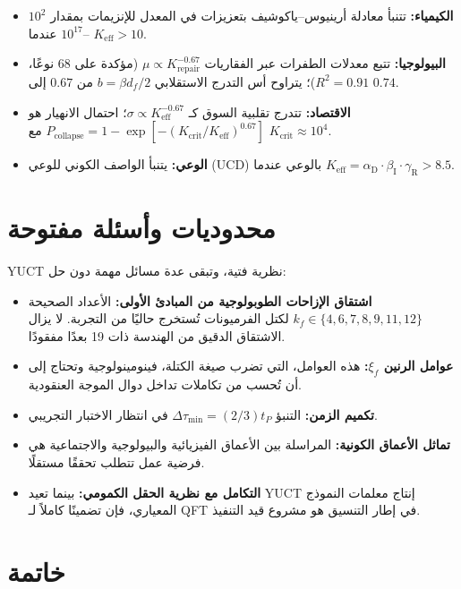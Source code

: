 \documentclass[11pt,a4paper]{article}
\theoremstyle{remark}
\newcommand{\Keff}{K_{\mathrm{eff}}}
\newcommand{\alD}{\alpha_{\mathrm{D}}}
\newcommand{\beI}{\beta_{\mathrm{I}}}
\newcommand{\gaR}{\gamma_{\mathrm{R}}}
\begin{document}
	\begin{itemize}
		\item \textbf{الكيمياء:} تتنبأ معادلة أرينيوس–ياكوشيف بتعزيزات في المعدل للإنزيمات بمقدار \(10^2\)–\(10^{17}\) عندما \(\Keff > 10\).
		\item \textbf{البيولوجيا:} تتبع معدلات الطفرات عبر الفقاريات \(\mu \propto K_{\text{repair}}^{-0.67}\) (مؤكدة على 68 نوعًا، \(R^2=0.91\))؛ يتراوح أس التدرج الاستقلابي \(b = \beta d_f/2\) من \(0.67\) إلى \(0.74\).
		\item \textbf{الاقتصاد:} تتدرج تقلبية السوق كـ \(\sigma \propto \Keff^{-0.67}\)؛ احتمال الانهيار هو \(P_{\text{collapse}} = 1 - \exp[-(K_{\text{crit}}/\Keff)^{0.67}]\) مع \(K_{\text{crit}} \approx 10^4\).
		\item \textbf{الوعي:} يتنبأ الواصف الكوني للوعي (UCD) بالوعي عندما \(\Keff = \alD \cdot \beI \cdot \gaR > 8.5\).
	\end{itemize}
	
	\section{محدوديات وأسئلة مفتوحة}
	\label{sec:limitations}
	
	YUCT نظرية فتية، وتبقى عدة مسائل مهمة دون حل:
	\begin{itemize}
		\item \textbf{اشتقاق الإزاحات الطوبولوجية من المبادئ الأولى:} الأعداد الصحيحة \(k_f \in \{4,6,7,8,9,11,12\}\) لكتل الفرميونات تُستخرج حاليًا من التجربة. لا يزال الاشتقاق الدقيق من الهندسة ذات 19 بعدًا مفقودًا.
		\item \textbf{عوامل الرنين \(\xi_f\):} هذه العوامل، التي تضرب صيغة الكتلة، فينومينولوجية وتحتاج إلى أن تُحسب من تكاملات تداخل دوال الموجة العنقودية.
		\item \textbf{تكميم الزمن:} التنبؤ \(\Delta\tau_{\min} = (2/3) t_P\) في انتظار الاختبار التجريبي.
		\item \textbf{تماثل الأعماق الكونية:} المراسلة بين الأعماق الفيزيائية والبيولوجية والاجتماعية هي فرضية عمل تتطلب تحققًا مستقلًا.
		\item \textbf{التكامل مع نظرية الحقل الكمومي:} بينما تعيد YUCT إنتاج معلمات النموذج المعياري، فإن تضمينًا كاملاً لـ QFT في إطار التنسيق هو مشروع قيد التنفيذ.
	\end{itemize}
	
	\section{خاتمة}
	\label{sec:conclusion}
	
\end{document}
